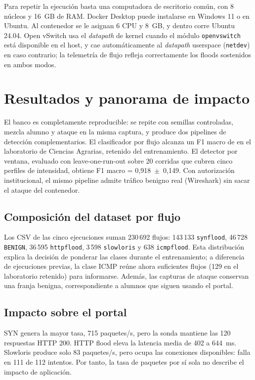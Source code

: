\documentclass[a4paper,fleqn]{cas-dc}
\begin{document}
Para repetir la ejecución basta una computadora de escritorio común, con 8 núcleos y 16~GB de RAM. Docker Desktop puede instalarse en Windows 11 o en Ubuntu. Al contenedor se le asignan 6 CPU y 8~GB, y dentro corre Ubuntu 24.04. Open vSwitch usa el \emph{datapath} de kernel cuando el módulo \texttt{openvswitch} está disponible en el host, y cae automáticamente al \emph{datapath} userspace (\texttt{netdev}) en caso contrario; la telemetría de flujo refleja correctamente los floods sostenidos en ambos modos.

\FloatBarrier
\section{Resultados y panorama de impacto}\label{sec:impact}

El banco es completamente reproducible: se repite con semillas controladas, mezcla alumno y ataque en la misma captura, y produce dos pipelines de detección complementarios. El clasificador por flujo alcanza un F1 macro de \FmacroEs{} en el laboratorio de Ciencias Agrarias, retenido del entrenamiento. El detector por ventana, evaluado con leave-one-run-out sobre 20 corridas que cubren cinco perfiles de intensidad, obtiene F1 macro = 0{,}918~$\pm$~0{,}149. Con autorización institucional, el mismo pipeline admite tráfico benigno real (Wireshark) sin sacar el ataque del contenedor.

\subsection{Composición del dataset por flujo}

Los CSV de las cinco ejecuciones suman 230\,692 flujos: 143\,133 \texttt{synflood}, 46\,728 \texttt{BENIGN}, 36\,595 \texttt{httpflood}, 3\,598 \texttt{slowloris} y 638 \texttt{icmpflood}. Esta distribución explica la decisión de ponderar las clases durante el entrenamiento; a diferencia de ejecuciones previas, la clase ICMP reúne ahora suficientes flujos (129 en el laboratorio retenido) para informarse. Además, las capturas de ataque conservan una franja benigna, correspondiente a alumnos que siguen usando el portal.

\subsection{Impacto sobre el portal}


SYN genera la mayor tasa, 715 paquetes/s, pero la sonda mantiene las 120 respuestas HTTP 200. HTTP flood eleva la latencia media de 402 a 644~ms. Slowloris produce solo 83 paquetes/s, pero ocupa las conexiones disponibles: falla en 111 de 112 intentos. Por tanto, la tasa de paquetes por sí sola no describe el impacto de aplicación.
\end{document}
